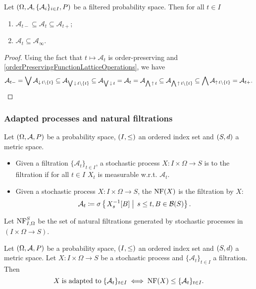 \begin{lemma}
Let $\left( \Omega, \mathcal{A}, \{\mathcal{A}_i\}_{i\in I}, P \right)$ be a filtered probability space. Then for all $t\in I$
\begin{enumerate}
\item $\mathcal{A}_{t-} \subseteq \mathcal{A}_{t} \subseteq \mathcal{A}_{t+}$;
\item $\mathcal{A}_{t} \subseteq \mathcal{A}_{\infty}$.
\end{enumerate}
\end{lemma}
\begin{proof}
Using the fact that $t\mapsto \mathcal{A}_t$ is order-preserving and \ref{orderPreservingFunctionLatticeOperations}, we have
\[ \mathcal{A}_{t-} = \bigvee\mathcal{A}_{\mathop{\downarrow} t \setminus\{t\}} \subseteq \mathcal{A}_{\bigvee \mathop{\downarrow} t \setminus\{t\}} \subseteq \mathcal{A}_{\bigvee \mathop{\downarrow} t} = \mathcal{A}_t = \mathcal{A}_{\bigwedge \mathop{\uparrow} t} \subseteq \mathcal{A}_{\bigwedge \mathop{\uparrow} t \setminus\{t\}} \subseteq \bigwedge \mathcal{A}_{\mathop{\uparrow} t \setminus\{t\}} = \mathcal{A}_{t+}. \]
\end{proof}

\subsubsection{Adapted processes and natural filtrations}
\begin{definition}
Let $\left( \Omega, \mathcal{A}, P \right)$ be a probability space, $\left( I,\leq \right)$ an ordered index set and $\left( S,d \right)$ a metric space.

\begin{itemize}
\item Given a filtration $\{\mathcal{A}_t\}_{t\in I}$, a stochastic process $X: I\times \Omega \to S$ is  to the filtration if for all $t\in I$ $X_t$ is measurable w.r.t. $\mathcal{A}_t$.
\item Given a stochastic process $X: I\times \Omega \to S$, the  $\operatorname{NF}(X)$ is the filtration  by $X$:
\[ \mathcal{A}_t \coloneqq \sigma\left\{\left. X_s^{-1}[B] \;\right|\; s\leq t, B\in \mathcal{B}(S) \right\}. \]
\end{itemize}

Let $\operatorname{NF}_{I,\Omega}^S$ be the set of natural filtrations generated by stochastic processes in $(I\times\Omega \to S)$.
\end{definition}

\begin{lemma}
Let $\left( \Omega, \mathcal{A}, P \right)$ be a probability space, $\left( I,\leq \right)$ an ordered index set and $\left( S,d \right)$ a metric space. Let $X: I\times \Omega\to S$ be a stochastic process and $\{\mathcal{A}_t\}_{t\in I}$ a filtration. Then
\[ X \;\text{is adapted to}\; \{\mathcal{A}_t\}_{t\in I} \iff \operatorname{NF}(X) \leq \{\mathcal{A}_t\}_{t\in I}. \]
\end{lemma}


